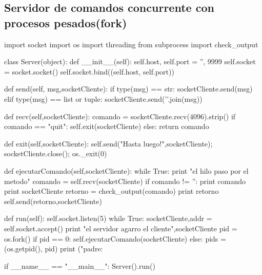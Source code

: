 \documentclass[12pt,a4paper,titlepage]{article}
\begin{document}
     \subsection{Servidor de comandos concurrente con procesos pesados(fork)}
    \begin{python}
import socket
import os
import threading
from subprocess import check_output

class Server(object):
    def __init__(self):
    	self.host, self.port = '', 9999
    	self.socket = socket.socket()
    	self.socket.bind((self.host, self.port))

    def send(self, msg,socketCliente):
    	if type(msg) == str: socketCliente.send(msg)
    	elif type(msg) == list or tuple: socketCliente.send('\n'.join(msg))

    def recv(self,socketCliente):
    	comando = socketCliente.recv(4096).strip()
        if comando == "quit":
            self.exit(socketCliente)
        else: return comando

    def exit(self,socketCliente):
    	self.send("Hasta luego!",socketCliente);
        socketCliente.close(); 
	os._exit(0)
    	
    
    def ejecutarComando(self,socketCliente):
	while True:
	    print "el hilo paso por el metodo"
	    comando = self.recv(socketCliente)
            if comando != '':
	        print comando
		print socketCliente
		retorno = check_output(comando)
		print retorno
		self.send(retorno,socketCliente)
    
    def run(self):
    	self.socket.listen(5)
	while True:
	    socketCliente,addr = self.socket.accept()
	    print "el servidor agarro el cliente",socketCliente
	    pid = os.fork()
            if pid == 0:
		self.ejecutarComando(socketCliente)
	    else:
        	pids = (os.getpid(), pid)
		print ("padre: %

if __name__ == "__main__":
    Server().run()

    \end{python}
\end{document}
